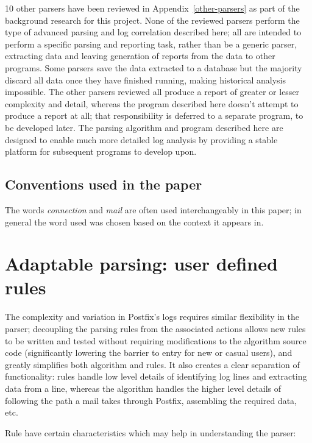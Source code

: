 \documentclass[a4paper,12pt,draft]{article}
\begin{document}
10 other parsers have been reviewed in Appendix~\ref{other-parsers} as part
of the background research for this project.  None of the reviewed parsers
perform the type of advanced parsing and log correlation described here;
all are intended to perform a specific parsing and reporting task, rather
than be a generic parser, extracting data and leaving generation of reports
from the data to other programs.  Some parsers save the data extracted to a
database but the majority discard all data once they have finished running,
making historical analysis impossible.  The other parsers reviewed all
produce a report of greater or lesser complexity and detail, whereas the
program described here doesn't attempt to produce a report at all; that
responsibility is deferred to a separate program, to be developed later.
The parsing algorithm and program described here are designed to enable
much more detailed log analysis by providing a stable platform for
subsequent programs to develop upon.



\subsection{Conventions used in the paper}

The words \textit{connection\/} and \textit{mail\/} are often used
interchangeably in this paper; in general the word used was chosen based on
the context it appears in.

\section{Adaptable parsing: user defined rules}

\label{rules}

The complexity and variation in Postfix's logs requires similar flexibility
in the parser; decoupling the parsing rules from the associated actions
allows new rules to be written and tested without requiring modifications
to the algorithm source code (significantly lowering the barrier to entry
for new or casual users), and greatly simplifies both algorithm and rules.
It also creates a clear separation of functionality: rules handle low level
details of identifying log lines and extracting data from a line, whereas
the algorithm handles the higher level details of following the path a mail
takes through Postfix, assembling the required data, etc.

Rule have certain characteristics which may help in understanding the
parser:
\end{document}
